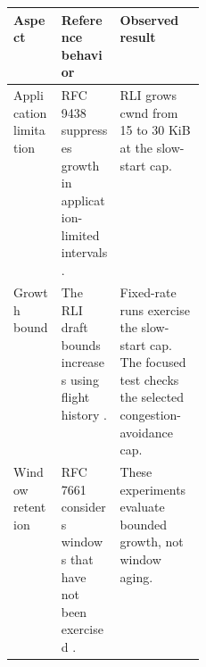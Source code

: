 \begin{center}\small
\begin{tabularx}{\linewidth}{@{}p{0.25\linewidth}XX@{}}
\textbf{Aspect} & \textbf{Reference behavior} & \textbf{Observed result}\\ \hline
Application limitation & RFC 9438 suppresses growth in application-limited intervals \cite{ref2}. & RLI grows cwnd from 15 to 30 KiB at the slow-start cap.\\[3pt]
Growth bound & The RLI draft bounds increases using flight history \cite{ref1}. & Fixed-rate runs exercise the slow-start cap. The focused test checks the selected congestion-avoidance cap.\\[3pt]
Window retention & RFC 7661 considers windows that have not been exercised \cite{ref6}. & These experiments evaluate bounded growth, not window aging.\\
\end{tabularx}
\end{center}
\label{sec:results-end}
